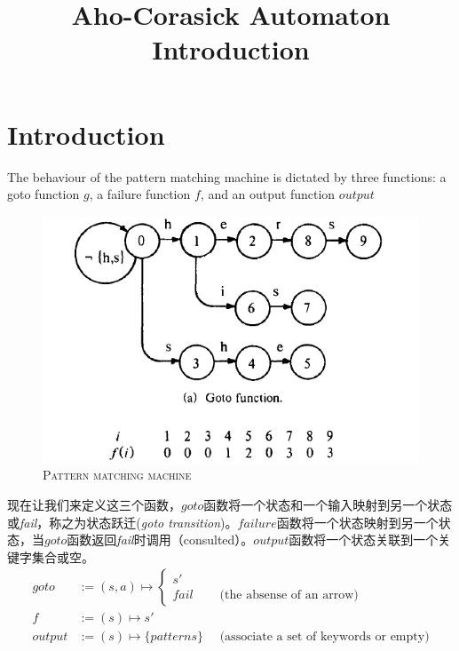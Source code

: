 \documentclass{article}
\begin{document}
\title{Aho-Corasick Automaton Introduction}
\author{}
\maketitle

\section{Introduction}
The behaviour of the pattern matching machine is dictated by three functions: a goto function $g$, a failure function $f$, and an output function $output$

\begin{figure}[h]
  \centering
\caption{\textsc{Pattern matching machine}}
\includegraphics[scale=0.6]{res/ac.png}
\end{figure}

现在让我们来定义这三个函数，$goto$函数将一个状态和一个输入映射到另一个状态或\emph{fail}，称之为状态跃迁(\textit{goto transition})。$failure$函数将一个状态映射到另一个状态，当$goto$函数返回\emph{fail}时调用（consulted）。$output$函数将一个状态关联到一个关键字集合或空。
\begin{align*}
goto    &:= (s,a) \mapsto
\begin{cases}
 s' \\
fail & \quad \text{ (the absense of an arrow)}
\end{cases}\\
f       &:= (s) \mapsto s'\\
output  &:= (s) \mapsto \{patterns\} \quad \text{ (associate a set of keywords or empty)}\\
\end{align*}
\end{document}
